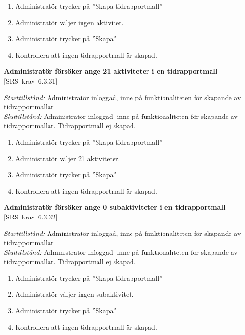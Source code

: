 \documentclass[a4paper]{article}
\def\reqinside{\hfil\penalty 100 \hfilneg \hbox}
\def \req [#1]{\reqinside{[SRS krav #1]}}
\begin{document}
\begin{FT}
\begin{enumerate}
\item Administratör trycker på ''Skapa tidrapportmall''
\item Administratör väljer ingen aktivitet.
\item Administratör trycker på ''Skapa''
\item Kontrollera att ingen tidrapportmall är skapad.
\end{enumerate}

\item
\textbf{Administratör försöker ange 21 aktiviteter i en tidrapportmall} \req[6.3.31]

\emph{Starttillstånd:} Administratör inloggad, inne på funktionaliteten för skapande av tidrapportmallar\\
\emph{Sluttillstånd:} Administratör inloggad, inne på funktionaliteten för skapande av tidrapportmallar. Tidrapportmall ej skapad.\\

\begin{enumerate}
\item Administratör trycker på ''Skapa tidrapportmall''
\item Administratör väljer 21 aktiviteter.
\item Administratör trycker på ''Skapa''
\item Kontrollera att ingen tidrapportmall är skapad.
\end{enumerate}


\item
\textbf{Administratör försöker ange 0 subaktiviteter i en tidrapportmall} \req[6.3.32]

\emph{Starttillstånd:} Administratör inloggad, inne på funktionaliteten för skapande av tidrapportmallar\\
\emph{Sluttillstånd:} Administratör inloggad, inne på funktionaliteten för skapande av tidrapportmallar. Tidrapportmall ej skapad.\\

\begin{enumerate}
\item Administratör trycker på ''Skapa tidrapportmall''
\item Administratör väljer ingen subaktivitet.
\item Administratör trycker på ''Skapa''
\item Kontrollera att ingen tidrapportmall är skapad.
\end{enumerate}



\end{FT}
\end{document}
